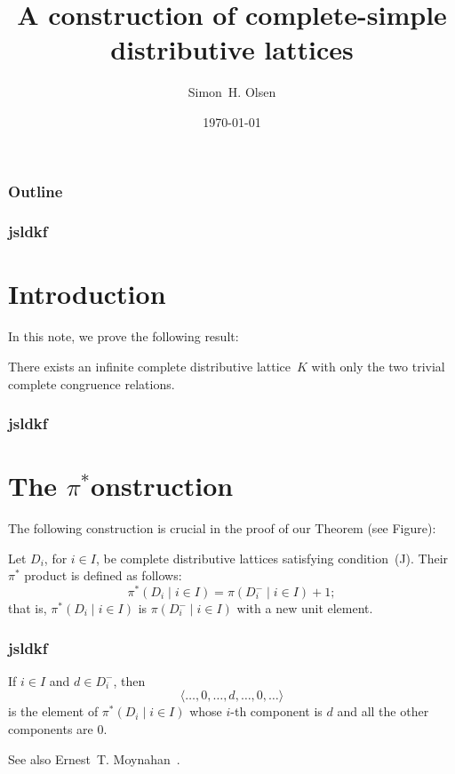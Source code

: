 \documentclass{beamer}
\begin{document}
\title[Complete-simple distributive lattices]%
{A construction of complete-simple\\  
       distributive lattices}
	   \author[]{Simon~H. Olsen}
\date{\today}

\begin{frame}
\titlepage
\end{frame}

\begin{frame}
	\frametitle{Outline}
\end{frame}

\begin{frame}
	\frametitle{jsldkf}
\section{Introduction}\label{S:intro} 
In this note, we prove the following result:

\begin{theorem} 
There exists an infinite complete distributive 
lattice~$K$ with only the two trivial complete 
congruence relations.
\end{theorem}
\end{frame}

\begin{frame}
	\frametitle{jsldkf}
	\section[Construction]{The \texorpdfstring{$\pi^{*}$} construction}\label{S:P*} 
The following construction is crucial in the proof
of our Theorem (see Figure):

\begin{definition}\label{D:P*} 
Let $D_{i}$, for $i \in I$, be complete distributive 
lattices satisfying condition~\textup{(J)}.  Their 
$\pi^{*}$ product is defined as follows:
\[
   \pi^{*} ( D_{i} \mid i \in I ) = 
   \pi ( D_{i}^{-} \mid i \in I ) + 1;
\]
that is, $\pi^{*} ( D_{i} \mid i \in I )$ is 
$\pi ( D_{i}^{-} \mid i \in I )$ with a new 
unit element. 
\end{definition}
\end{frame}

\begin{frame}
	\frametitle{jsldkf}
If $i \in I$ and $d \in D_{i}^{-}$, then
\[
  \langle \dots, 0, \dots, d, \dots, 0, \dots \rangle
\]
is the element of $\pi^{*} ( D_{i} \mid i \in I )$ whose 
$i$-th component is $d$ and all the other components 
are $0$.

See also Ernest~T. Moynahan~\cite{eM57a}.
\end{frame}
\end{document}
